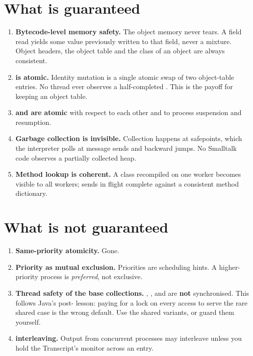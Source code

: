 \section{What is guaranteed}

\begin{enumerate}
\item \textbf{Bytecode-level memory safety.} The object memory never tears. A
  field read yields some value previously written to that field, never a
  mixture. Object headers, the object table and the class of an object are
  always consistent.
\item \textbf{ is atomic.} Identity mutation is a single atomic
  swap of two object-table entries. No thread ever observes a half-completed
  . This is the payoff for keeping an object table.
\item \textbf{ and  are atomic} with respect to
  each other and to process suspension and resumption.
\item \textbf{Garbage collection is invisible.} Collection happens at
  safepoints, which the interpreter polls at message sends and backward jumps.
  No Smalltalk code observes a partially collected heap.
\item \textbf{Method lookup is coherent.} A class recompiled on one worker
  becomes visible to all workers; sends in flight complete against a
  consistent method dictionary.
\end{enumerate}

\section{What is not guaranteed}

\begin{enumerate}
\item \textbf{Same-priority atomicity.} Gone.
\item \textbf{Priority as mutual exclusion.} Priorities are scheduling hints.
  A higher-priority process is \emph{preferred}, not exclusive.
\item \textbf{Thread safety of the base collections.}
  , ,  and  are
  \textbf{not} synchronised. This follows Java's post- lesson:
  paying for a lock on every access to serve the rare shared case is the wrong
  default. Use the shared variants, or guard them yourself.
\item \textbf{ interleaving.} Output from concurrent processes
  may interleave unless you hold the Transcript's monitor across an entry.
\end{enumerate}

